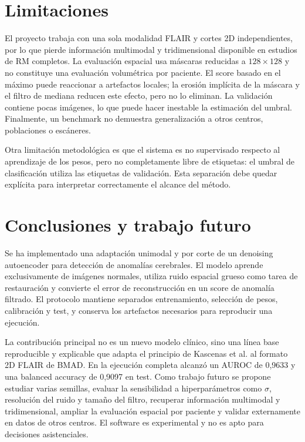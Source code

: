 \documentclass[10pt,a4paper,twocolumn]{article}
\begin{document}
\section{Limitaciones}
El proyecto trabaja con una sola modalidad FLAIR y cortes 2D independientes, por
lo que pierde información multimodal y tridimensional disponible en estudios de
RM completos. La evaluación espacial usa máscaras reducidas a $128\times128$
y no constituye una evaluación volumétrica por paciente. El score basado en el máximo puede reaccionar a
artefactos locales; la erosión implícita de la máscara y el filtro de mediana
reducen este efecto, pero no lo eliminan. La validación contiene pocas imágenes,
lo que puede hacer inestable la estimación del umbral. Finalmente, un benchmark
no demuestra generalización a otros centros, poblaciones o escáneres.

Otra limitación metodológica es que el sistema es no supervisado respecto al
aprendizaje de los pesos, pero no completamente libre de etiquetas: el umbral de
clasificación utiliza las etiquetas de validación. Esta separación debe quedar
explícita para interpretar correctamente el alcance del método.

\section{Conclusiones y trabajo futuro}
Se ha implementado una adaptación unimodal y por corte de un denoising
autoencoder para detección de anomalías cerebrales. El modelo aprende
exclusivamente de imágenes normales, utiliza ruido espacial grueso como tarea de
restauración y convierte el error de reconstrucción en un score de anomalía
filtrado. El protocolo mantiene separados entrenamiento, selección de pesos,
calibración y test, y conserva los artefactos necesarios para reproducir una
ejecución.

La contribución principal no es un nuevo modelo clínico, sino una línea base
reproducible y explicable que adapta el principio de Kascenas et al. al formato
2D FLAIR de BMAD. En la ejecución completa alcanzó un AUROC de 0,9633 y una
balanced accuracy de 0,9097 en test. Como trabajo futuro se propone estudiar varias semillas,
evaluar la sensibilidad a hiperparámetros como $\sigma$, resolución del ruido y
tamaño del filtro, recuperar información multimodal y tridimensional, ampliar
la evaluación espacial por paciente y validar externamente en datos de
otros centros. El software es experimental y no es apto para decisiones
asistenciales.



\end{document}
